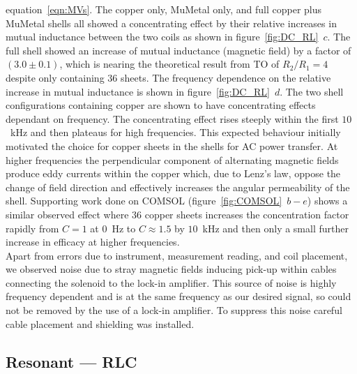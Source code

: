 \documentclass[11pt]{iopart}
\begin{document}
equation~\ref{eqn:MVs}. The copper only, MuMetal only, and full copper
plus MuMetal shells all showed a concentrating effect by their
relative increases in mutual inductance between the two coils as shown
in figure~\ref{fig:DC_RL}~$c$. The full shell showed an increase of
mutual inductance (magnetic field) by a factor of $(3.0\pm0.1)$, which
is nearing the theoretical result from TO of $R_2/R_1 = 4$ despite
only containing $36$ sheets. The frequency dependence on the relative
increase in mutual inductance is shown in
figure~\ref{fig:DC_RL}~$d$. The two shell configurations containing
copper are shown to have concentrating effects dependant on
frequency. The concentrating effect rises steeply within the first
$10$~kHz and then plateaus for high frequencies.  This expected
behaviour initially motivated the choice for copper sheets in the
shells for AC power transfer. At higher frequencies the perpendicular
component of alternating magnetic fields produce eddy currents within
the copper which, due to Lenz's law, oppose the change of field
direction and effectively increases the angular permeability of the
shell.  Supporting work done on COMSOL (figure~\ref{fig:COMSOL}~$b-e$)
shows a similar observed effect where $36$ copper sheets increases the
concentration factor rapidly from $C = 1$ at $0$~Hz to $C \approx 1.5$
by $10$~kHz and then only a small further increase in efficacy at
higher frequencies.\\ Apart from errors due to instrument, measurement
reading, and coil placement, we observed noise due to stray magnetic
fields inducing pick-up within cables connecting the solenoid to the
lock-in amplifier. This source of noise is highly frequency dependent
and is at the same frequency as our desired signal, so could not be
removed by the use of a lock-in amplifier. To suppress this noise
careful cable placement and shielding was installed. \\

\subsection*{Resonant --- RLC}
\end{document}
